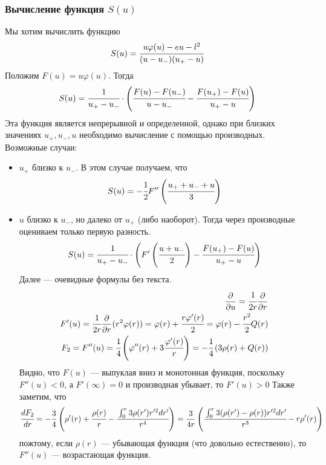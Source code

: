 	\subsubsection{Вычисление функция $S(u)$}
	Мы хотим вычислить функцию 
	\begin{equation}
		S(u) = \cfrac{u\varphi(u) -eu-l^2}{(u-u_{-})(u_{+}-u)}
	\end{equation}
	Положим $F(u) = u\varphi(u)$.
	Тогда 
	\begin{equation}
		S(u) = \cfrac{1}{u_{+}-u_{-}}\cdot 
		\left(\cfrac{F(u)-F(u_{-})}{u-u_{-}} - \cfrac{F(u_{+})-F(u)}{u_{+}-u}\right)
	\end{equation}
	Эта функция является непрерывной и определенной, однако при близких значениях $u_{+}, u_{-}, u$ необходимо вычисление с помощью производных.
	Возможные случаи:
	\begin{itemize}
		\item $u_{+}$ близко к $u_{-}$. В этом случае получаем, что 
		\begin{equation}
			S(u) = -\cfrac{1}{2}F''\left(\cfrac{u_{+} + u_{-} + u}{3}\right)
		\end{equation}
		
		\item $u$ близко к $u_{-}$, но далеко от $u_{+}$ (либо наоборот). Тогда через производные оцениваем только первую разность.
		\begin{equation}
			S(u) = \cfrac{1}{u_{+}-u_{-}}\cdot 
			\left(F'\left(\cfrac{u+u_{-}}{2}\right) - \cfrac{F(u_{+})-F(u)}{u_{+}-u}\right)
		\end{equation}
		Далее --- очевидные формулы без текста.
		\begin{eqnarray}
			\frac{\partial }{\partial u} = \cfrac{1}{2r}\frac{\partial }{\partial r}\\
			F'(u) = \cfrac{1}{2r}\frac{\partial }{\partial r}(r^2\varphi(r)) = 
			\varphi(r) + \cfrac{r\varphi'(r)}{2} = \varphi(r) -\cfrac{r^2}{2} Q(r) \\
			F_2 = F''(u) = \cfrac{1}{4}
			\left( \varphi''(r) + 3\cfrac{\varphi'(r)}{r}\right) = -\cfrac{1}{4}\left(3\rho(r) + Q(r)\right)
		\end{eqnarray}
		Видно, что $F(u)$ --- выпуклая вниз и монотонная функция, поскольку $F''(u) < 0$, а $F'(\infty) = 0$ и производная убывает, то $F'(u) > 0$
		Также заметим, что
		\begin{equation*}
			\cfrac{dF_2}{dr} = -\frac{3}{4}\left(
			\rho'(r) + \cfrac{\rho(r)}{r} - \cfrac{\int_0^r{3\rho(r')r'^2dr'}}{r^4}
			\right) = 
			\frac{3}{4r}\left(
				\cfrac{\int_0^r{3(\rho(r')- \rho(r))r'^2dr'}}{r^3}
				- r\rho'(r)
			\right)
		\end{equation*}
		пожтому, если $\rho(r)$ --- убывающая функция (что довольно естественно), то $F''(u)$ --- возрастающая функция.
	\end{itemize}
	
